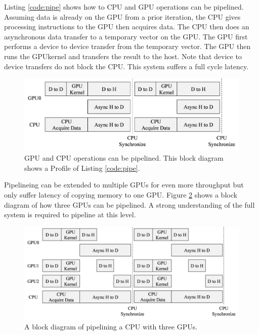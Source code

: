 Listing \ref{code:pipe} shows how to CPU and GPU operations can be pipelined.
Assuming data is already on the GPU from a prior iteration, the CPU gives processing instructions to the GPU then acquires data.
The CPU then does an asynchronous data transfer to a temporary vector on the GPU.
The GPU first performs a device to device transfer from the temporary vector.
The GPU then runs the GPUkernel and transfers the result to the host.
Note that device to device transfers do not block the CPU.
This system suffers a full cycle latency.
\begin{figure}
	\centering\includegraphics[width=9.97in/100*55]{figures/gpu_intro/concurrentCPU_nonBlocking.pdf}
	\caption{GPU and CPU operations can be pipelined. This block diagram shows a Profile of Listing \ref{code:pipe}.}
	\label{fig:concurrentCPU_nonBlocking}
\end{figure}

Pipelineing can be extended to multiple GPUs for even more throughput but only suffer latency of copying memory to one GPU.
Figure \ref{fig:concurrentCPU_nonBlocking_multiGPU} shows a block diagram of how three GPUs can be pipelined.
A strong understanding of the full system is required to pipeline at this level.
\begin{figure}
	\centering\includegraphics[width=11.4in/100*55]{figures/gpu_intro/concurrentCPU_nonBlocking_multiGPU.pdf}
	\caption{A block diagram of pipelining a CPU with three GPUs.}
	\label{fig:concurrentCPU_nonBlocking_multiGPU}
\end{figure}

